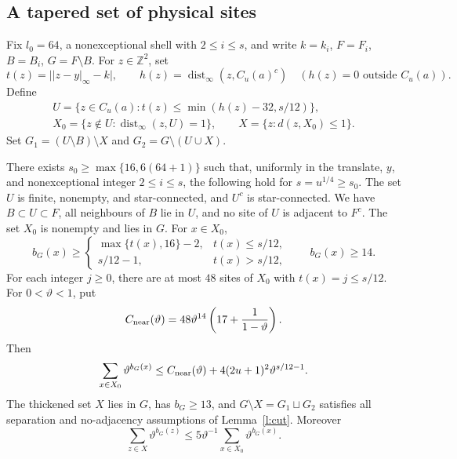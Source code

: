 \subsection{A tapered set of physical sites}\label{s:cutgeom}

\begin{definition}\label{d:thickcut}
Fix \(l_0=64\), a nonexceptional shell with \(2\le i\le s\),
and write \(k=k_i\), \(F=F_i\), \(B=B_i\), \(G=F\setminus B\).
For \(z\in\mathbb Z^2\), set
\[
 t(z)=\big||z-y|_\infty-k\big|,\qquad
 h(z)=\operatorname{dist}_\infty(z,C_u(a)^c)\quad
        (h(z)=0\text{ outside }C_u(a)).
\]
Define
\[
 \begin{gathered}
 U=\{z\in C_u(a):t(z)\le\min(h(z)-32,s/12)\},\\
 X_0=\{z\notin U:\operatorname{dist}_\infty(z,U)=1\},\qquad
 X=\{z:d(z,X_0)\le1\}.
 \end{gathered}
\]
Set \(G_1=(U\setminus B)\setminus X\) and
\(G_2=G\setminus(U\cup X)\).
\end{definition}

\begin{lemma}\label{l:cutgeom}
There exists \(s_0\ge\max\{16,6(64+1)\}\) such that, uniformly
in the translate, \(y\), and nonexceptional integer \(2\le i\le s\),
the following hold for \(s=u^{1/4}\ge s_0\).
The set \(U\) is finite, nonempty, and star-connected, and \(U^c\)
is star-connected. We have \(B\subset U\subset F\), all neighbours
of \(B\) lie in \(U\), and no site of \(U\) is adjacent to \(F^c\).
The set \(X_0\) is nonempty and lies in \(G\). For \(x\in X_0\),
\[
 b_G(x)\ge
 \begin{cases}\max\{t(x),16\}-2,&t(x)\le s/12,\\s/12-1,&t(x)>s/12,
 \end{cases}
 \qquad b_G(x)\ge14 .
\]
For each integer \(j\ge0\), there are at most \(48\) sites of
\(X_0\) with \(t(x)=j\le s/12\).
For \(0<\vartheta<1\), put
\[
 C_{\rm near}(\vartheta)=48\vartheta^{14}
                \left(17+\frac1{1-\vartheta}\right).
\]
Then
\[
 \sum_{x\in X_0}\vartheta^{b_G(x)}
 \le C_{\rm near}(\vartheta)
                 +4(2u+1)^2\vartheta^{s/12-1}.
\]
The thickened set \(X\) lies in \(G\), has \(b_G\ge13\), and
\(G\setminus X=G_1\sqcup G_2\) satisfies all separation and
no-adjacency assumptions of Lemma~\ref{l:cut}. Moreover
\[
 \sum_{z\in X}\vartheta^{b_G(z)}
       \le5\vartheta^{-1}\sum_{x\in X_0}\vartheta^{b_G(x)} .
\]
\end{lemma}

